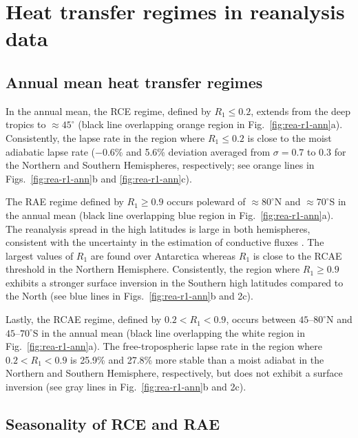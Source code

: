 \documentclass{ametsocV5}
\begin{document}
\section{Heat transfer regimes in reanalysis data} \label{sec:diagnostics}

    \subsection{Annual mean heat transfer regimes}
    In the annual mean, the RCE regime, defined by $R_1 \le 0.2$, extends from the deep tropics to $\approx 45^\circ$ (black line overlapping orange region in Fig.~\ref{fig:rea-r1-ann}a). Consistently, the lapse rate in the region where $R_1 \le 0.2$ is close to the moist adiabatic lapse rate ($-0.6$\% and 5.6\% deviation averaged from $\sigma=0.7$ to 0.3 for the Northern and Southern Hemispheres, respectively; see orange lines in Figs.~\ref{fig:rea-r1-ann}b and \ref{fig:rea-r1-ann}c).

    The RAE regime defined by $R_1 \ge 0.9$ occurs poleward of $\approx 80^\circ$N and $\approx 70^\circ$S in the annual mean (black line overlapping blue region in Fig.~\ref{fig:rea-r1-ann}a). The reanalysis spread in the high latitudes is large in both hemispheres, consistent with the uncertainty in the estimation of conductive fluxes \citep{tastula2013,graham2019}. The largest values of $R_1$ are found over Antarctica whereas $R_1$ is close to the RCAE threshold in the Northern Hemisphere. Consistently, the region where $R_1 \ge 0.9$ exhibits a stronger surface inversion in the Southern high latitudes compared to the North (see blue lines in Figs.~\ref{fig:rea-r1-ann}b and 2c).

    Lastly, the RCAE regime, defined by $0.2 < R_1 < 0.9$, occurs between $45$--$80^\circ$N and $45$--$70^\circ$S in the annual mean (black line overlapping the white region in Fig.~\ref{fig:rea-r1-ann}a). The free-tropospheric lapse rate in the region where $0.2 < R_1 < 0.9$ is 25.9\% and 27.8\% more stable than a moist adiabat in the Northern and Southern Hemisphere, respectively, but does not exhibit a surface inversion (see gray lines in Fig.~\ref{fig:rea-r1-ann}b and 2c).

    \subsection{Seasonality of RCE and RAE} \label{subsec:seasonality}
\end{document}
